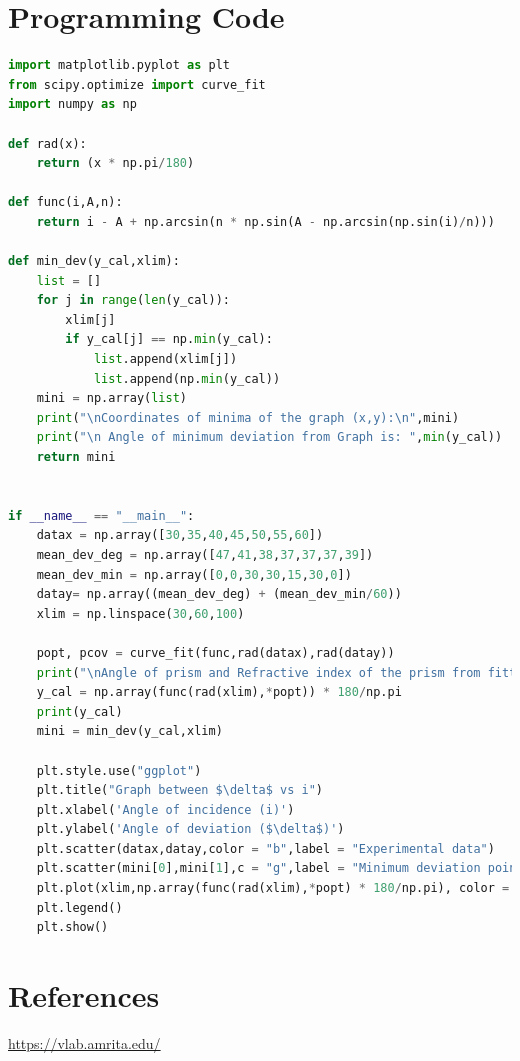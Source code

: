 \documentclass{article}
\begin{document}
	
	
\section{\LARGE Programming Code}
\begin{lstlisting}[language=Python]
import matplotlib.pyplot as plt
from scipy.optimize import curve_fit
import numpy as np

def rad(x):
    return (x * np.pi/180)

def func(i,A,n):
    return i - A + np.arcsin(n * np.sin(A - np.arcsin(np.sin(i)/n)))

def min_dev(y_cal,xlim):
    list = []
    for j in range(len(y_cal)):
        xlim[j]
        if y_cal[j] == np.min(y_cal):
            list.append(xlim[j])
            list.append(np.min(y_cal))
    mini = np.array(list)
    print("\nCoordinates of minima of the graph (x,y):\n",mini)
    print("\n Angle of minimum deviation from Graph is: ",min(y_cal))
    return mini
    

if __name__ == "__main__":
    datax = np.array([30,35,40,45,50,55,60])
    mean_dev_deg = np.array([47,41,38,37,37,37,39])
    mean_dev_min = np.array([0,0,30,30,15,30,0])
    datay= np.array((mean_dev_deg) + (mean_dev_min/60))
    xlim = np.linspace(30,60,100)

    popt, pcov = curve_fit(func,rad(datax),rad(datay))
    print("\nAngle of prism and Refractive index of the prism from fitting:\n",popt,"\n")
    y_cal = np.array(func(rad(xlim),*popt)) * 180/np.pi
    print(y_cal)
    mini = min_dev(y_cal,xlim)
    
    plt.style.use("ggplot")
    plt.title("Graph between $\delta$ vs i")
    plt.xlabel('Angle of incidence (i)')
    plt.ylabel('Angle of deviation ($\delta$)')
    plt.scatter(datax,datay,color = "b",label = "Experimental data")
    plt.scatter(mini[0],mini[1],c = "g",label = "Minimum deviation point")
    plt.plot(xlim,np.array(func(rad(xlim),*popt) * 180/np.pi), color = "r",label = "Fitting curve")
    plt.legend()
    plt.show()
\end{lstlisting}
\newpage
\section{\Large References}
    \url{https://vlab.amrita.edu/}
\end{document}
